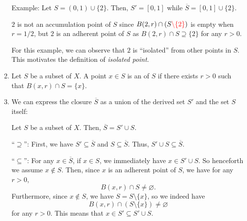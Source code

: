 \begin{enumerate}
Example: Let \(S=(0,1)\cup\{2\}\). Then, \(S'=[0,1]\) while
\(\overline{S}=[0,1]\cup\{2\}\). \begin{note} \(2\) is not an accumulation
point of \(S\) since \(B(2,r)\cap (S{\color{red}\setminus\{2\}})\) is empty
when \(r=1/2\), but \(2\) is an adherent point of \(S\) as \(B(2,r)\cap
S\supseteq \{2\}\) for any \(r>0\).
\end{note} For this example, we can observe that \(2\) is ``isolated'' from
other points in \(S\). This motivates the definition of \emph{isolated point}.

\item Let \(S\) be a subset of \(X\). A point \(x\in S\) is an  of \(S\) if there exists \(r>0\) such that \(B(x,r)\cap S=\{x\}\).
\begin{center}
\end{center}


\item We can express the closure \(\overline{S}\) as a union of the derived set
\(S'\) and the set \(S\) itself:
\begin{proposition}
\label{prp:clos-union-deriv-s}
Let \(S\) be a subset of \(X\). Then, \(\overline{S}=S'\cup S\).
\end{proposition}
\begin{pf}
``\(\supseteq\)'': First, we have \(S'\subseteq \overline{S}\) and \(S\subseteq
\overline{S}\). Thus, \(S'\cup S\subseteq \overline{S}\).

``\(\subseteq\)'': For any \(x\in\overline{S}\), if \(x\in S\), we immediately
have \(x\in S'\cup S\). So henceforth we assume \(x\notin S\). Then, since
\(x\) is an adherent point of \(S\), we have for any \(r>0\),
\[
B(x,r)\cap S\ne\varnothing.
\]
Furthermore, since \(x\notin S\), we have \(S=S\setminus\{x\}\), so we indeed
have
\[
B(x,r)\cap (S\setminus\{x\})\ne\varnothing
\]
for any \(r>0\). This means that \(x\in S'\subseteq S'\cup S\).
\end{pf}


\end{enumerate}
